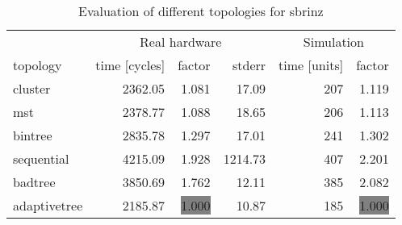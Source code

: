 \begin{table}[htb]
  \centering
  \begin{tabular}{lrrrrr}
  \toprule
  & \multicolumn{3}{c}{Real hardware} & \multicolumn{2}{c}{Simulation} \\
  topology & time [cycles] & factor & stderr & time [units] & factor \\
  \midrule
  cluster & 2362.05 & 1.081 & 17.09 & 207 & 1.119 \\
  mst & 2378.77 & 1.088 & 18.65 & 206 & 1.113 \\
  bintree & 2835.78 & 1.297 & 17.01 & 241 & 1.302 \\
  sequential & 4215.09 & 1.928 & 1214.73 & 407 & 2.201 \\
  badtree & 3850.69 & 1.762 & 12.11 & 385 & 2.082 \\
  adaptivetree & 2185.87 & \colorbox{gray}{1.000} & 10.87 & 185 & \colorbox{gray}{1.000} \\
  \midrule
  \end{tabular}
  \caption{Evaluation of different topologies for sbrinz}
  \label{tab:sbrinz}
\end{table}
